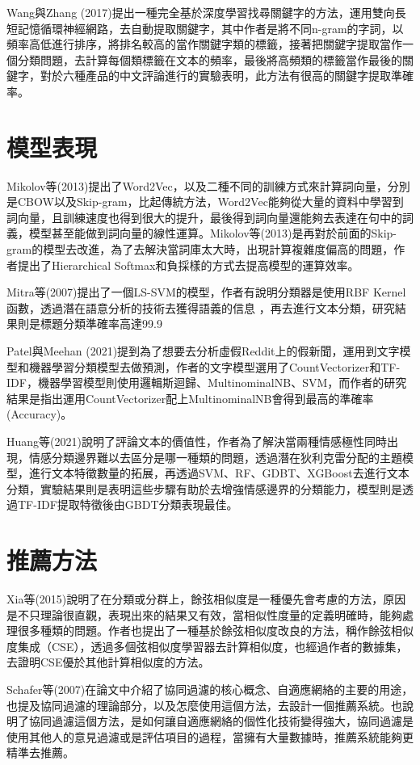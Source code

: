 	Wang與Zhang (2017)提出一種完全基於深度學習找尋關鍵字的方法，運用雙向長短記憶循環神經網路，去自動提取關鍵字，其中作者是將不同n-gram的字詞，以頻率高低進行排序，將排名較高的當作關鍵字類的標籤，接著把關鍵字提取當作一個分類問題，去計算每個類標籤在文本的頻率，最後將高頻類的標籤當作最後的關鍵字，對於六種產品的中文評論進行的實驗表明，此方法有很高的關鍵字提取準確率。
	
	
\newpage
	
\section{模型表現}

	Mikolov等(2013)提出了Word2Vec，以及二種不同的訓練方式來計算詞向量，分別是CBOW以及Skip-gram，比起傳統方法，Word2Vec能夠從大量的資料中學習到詞向量，且訓練速度也得到很大的提升，最後得到詞向量還能夠去表達在句中的詞義，模型甚至能做到詞向量的線性運算。Mikolov等(2013)是再對於前面的Skip-gram的模型去改進，為了去解決當詞庫太大時，出現計算複雜度偏高的問題，作者提出了Hierarchical Softmax和負採樣的方式去提高模型的運算效率。
	
	Mitra等(2007)提出了一個LS-SVM的模型，作者有說明分類器是使用RBF Kernel函數，透過潛在語意分析的技術去獲得語義的信息 ，再去進行文本分類，研究結果則是標題分類準確率高達99.9%
	
	Patel與Meehan (2021)提到為了想要去分析虛假Reddit上的假新聞，運用到文字模型和機器學習分類模型去做預測，作者的文字模型選用了CountVectorizer和TF-IDF，機器學習模型則使用邏輯斯迴歸、MultinominalNB、SVM，而作者的研究結果是指出運用CountVectorizer配上MultinominalNB會得到最高的準確率(Accuracy)。
	
	Huang等(2021)說明了評論文本的價值性，作者為了解決當兩種情感極性同時出現，情感分類邊界難以去區分是哪一種類的問題，透過潛在狄利克雷分配的主題模型，進行文本特徵數量的拓展，再透過SVM、RF、GDBT、XGBoost去進行文本分類，實驗結果則是表明這些步驟有助於去增強情感邊界的分類能力，模型則是透過TF-IDF提取特徵後由GBDT分類表現最佳。
	
\newpage
	
\section{推薦方法}

	Xia等(2015)說明了在分類或分群上，餘弦相似度是一種優先會考慮的方法，原因是不只理論很直觀，表現出來的結果又有效，當相似性度量的定義明確時，能夠處理很多種類的問題。作者也提出了一種基於餘弦相似度改良的方法，稱作餘弦相似度集成（CSE），透過多個弦相似度學習器去計算相似度，也經過作者的數據集，去證明CSE優於其他計算相似度的方法。
	
	Schafer等(2007)在論文中介紹了協同過濾的核心概念、自適應網絡的主要的用途，也提及協同過濾的理論部分，以及怎麼使用這個方法，去設計一個推薦系統。也說明了協同過濾這個方法，是如何讓自適應網絡的個性化技術變得強大，協同過濾是使用其他人的意見過濾或是評估項目的過程，當擁有大量數據時，推薦系統能夠更精準去推薦。
	
	
	
%




